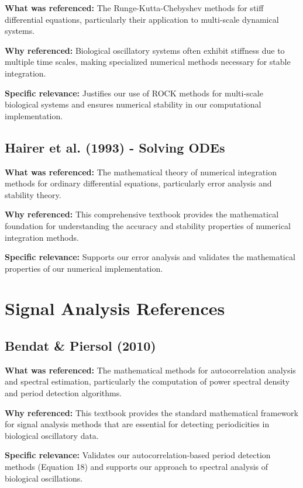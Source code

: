 \documentclass{article}
\begin{document}
\textbf{What was referenced:} The Runge-Kutta-Chebyshev methods for stiff differential equations, particularly their application to multi-scale dynamical systems.

\textbf{Why referenced:} Biological oscillatory systems often exhibit stiffness due to multiple time scales, making specialized numerical methods necessary for stable integration.

\textbf{Specific relevance:} Justifies our use of ROCK methods for multi-scale biological systems and ensures numerical stability in our computational implementation.

\subsection{Hairer et al. (1993) - Solving ODEs}

\textbf{What was referenced:} The mathematical theory of numerical integration methods for ordinary differential equations, particularly error analysis and stability theory.

\textbf{Why referenced:} This comprehensive textbook provides the mathematical foundation for understanding the accuracy and stability properties of numerical integration methods.

\textbf{Specific relevance:} Supports our error analysis and validates the mathematical properties of our numerical implementation.

\section{Signal Analysis References}

\subsection{Bendat \& Piersol (2010)}

\textbf{What was referenced:} The mathematical methods for autocorrelation analysis and spectral estimation, particularly the computation of power spectral density and period detection algorithms.

\textbf{Why referenced:} This textbook provides the standard mathematical framework for signal analysis methods that are essential for detecting periodicities in biological oscillatory data.

\textbf{Specific relevance:} Validates our autocorrelation-based period detection methods (Equation 18) and supports our approach to spectral analysis of biological oscillations.
\end{document}
